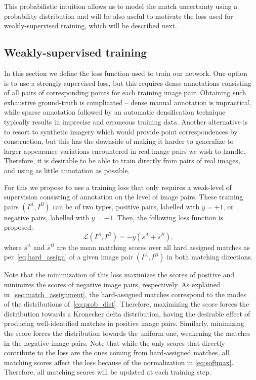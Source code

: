 \documentclass{article}
\begin{document}
This probabilistic intuition allows us to model the match uncertainty using a probability distribution and  will be also useful to motivate the loss used for weakly-supervised training, which will be described next.

\subsection{Weakly-supervised training}
In this section we define the loss function used to train our network.
One option is to use a strongly-supervised loss, but this requires dense annotations consisting of all pairs of corresponding points for each training image pair. Obtaining such exhaustive ground-truth is complicated -- dense manual annotation is impractical, while sparse annotation followed by an automatic densification technique typically results in imprecise and erroneous training data. Another alternative is to resort to synthetic imagery which would provide point correspondences by construction, but this has the downside of making it harder to generalize to larger appearance variations encountered in real image pairs we wish to handle. Therefore, it is desirable to be able to train directly from pairs of real images, and using as little annotation as possible.

For this we propose to use a training loss that only requires a weak-level of supervision consisting of annotation on the level of image pairs.  These training pairs $(I^A,I^B)$ can be of two types, positive pairs, labelled with $y=+1$, or negative pairs, labelled with $y=-1$. Then, the following loss function is proposed:
\begin{equation}
    \mathcal{L}(I^A,I^B)=-y\left(\bar{s}^A + \bar{s}^B\right),
    \label{eq:loss}
\end{equation}
where $\bar{s}^A$ and $\bar{s}^B$ are the mean matching scores over all hard assigned matches as per~\eqref{eq:hard_assign} of a given image pair $(I^A,I^B)$ in both matching directions.

Note that the minimization of this loss maximizes the scores of positive and minimizes the scores of negative image pairs, respectively. As explained in~\ref{sec:match_assignment}, the hard-assigned matches correspond to the modes of the distributions of~\eqref{eq:prob_dist}. Therefore, maximizing the score forces the distribution towards a Kronecker delta distribution, having the desirable effect of producing well-identified matches in positive image pairs. Similarly, minimizing the score forces the distribution towards the uniform one, weakening the matches in the negative image pairs. Note that while the only scores that directly contribute to the loss are the ones coming from hard-assigned matches, all matching scores affect the loss because of the normalization in \eqref{eq:softmax}. Therefore, all matching scores will be updated at each training step.
\end{document}
